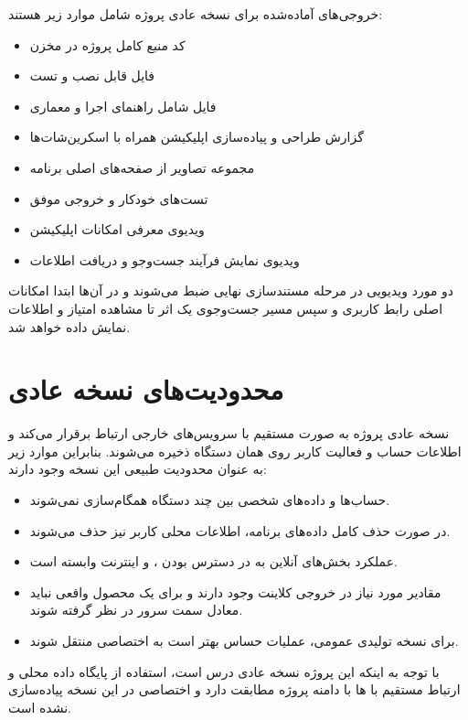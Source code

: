 \documentclass[a4paper,14pt]{extarticle}
\begin{document}
خروجی‌های آماده‌شده برای نسخه عادی پروژه شامل موارد زیر هستند:

\begin{itemize}
    \item کد منبع کامل پروژه در مخزن 
    \item فایل  قابل نصب و تست
    \item فایل  شامل راهنمای اجرا و معماری
    \item گزارش طراحی و پیاده‌سازی اپلیکیشن همراه با اسکرین‌شات‌ها
    \item مجموعه تصاویر از صفحه‌های اصلی برنامه
    \item تست‌های خودکار و خروجی موفق 
    \item ویدیوی معرفی امکانات اپلیکیشن
    \item ویدیوی نمایش فرآیند جست‌وجو و دریافت اطلاعات 
\end{itemize}

دو مورد ویدیویی در مرحله مستندسازی نهایی ضبط می‌شوند و در آن‌ها ابتدا امکانات اصلی رابط کاربری و سپس مسیر جست‌وجوی یک اثر تا مشاهده امتیاز و اطلاعات  نمایش داده خواهد شد.

\section*{محدودیت‌های نسخه عادی}

نسخه عادی پروژه به صورت مستقیم با سرویس‌های خارجی ارتباط برقرار می‌کند و اطلاعات حساب و فعالیت کاربر روی همان دستگاه ذخیره می‌شوند. بنابراین موارد زیر به عنوان محدودیت طبیعی این نسخه وجود دارند:

\begin{itemize}
    \item حساب‌ها و داده‌های شخصی بین چند دستگاه همگام‌سازی نمی‌شوند.
    \item در صورت حذف کامل داده‌های برنامه، اطلاعات محلی کاربر نیز حذف می‌شوند.
    \item عملکرد بخش‌های آنلاین به در دسترس بودن ،  و اینترنت وابسته است.
    \item مقادیر مورد نیاز  در خروجی کلاینت وجود دارند و برای یک محصول واقعی نباید معادل  سمت سرور در نظر گرفته شوند.
    \item برای نسخه تولیدی عمومی، عملیات حساس بهتر است به  اختصاصی منتقل شوند.
\end{itemize}

با توجه به اینکه این پروژه نسخه عادی درس است، استفاده از پایگاه داده محلی و ارتباط مستقیم با ها با دامنه پروژه مطابقت دارد و  اختصاصی در این نسخه پیاده‌سازی نشده است.
\end{document}
